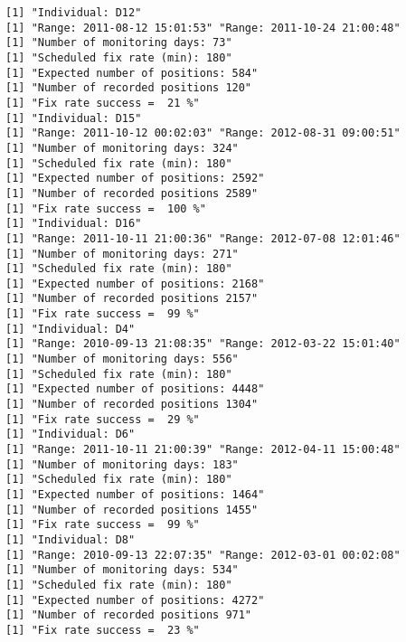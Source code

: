 \documentclass[
  letterpaper,
]{book}
\newenvironment{Shaded}{\begin{snugshade}}{\end{snugshade}}
\newcommand{\DecValTok}[1]{\textcolor[rgb]{0.68,0.00,0.00}{#1}}
\newcommand{\DocumentationTok}[1]{\textcolor[rgb]{0.37,0.37,0.37}{\textit{#1}}}
\newcommand{\FunctionTok}[1]{\textcolor[rgb]{0.28,0.35,0.67}{#1}}
\newcommand{\NormalTok}[1]{\textcolor[rgb]{0.00,0.23,0.31}{#1}}
\newcommand{\OtherTok}[1]{\textcolor[rgb]{0.00,0.23,0.31}{#1}}
\newcommand{\SpecialCharTok}[1]{\textcolor[rgb]{0.37,0.37,0.37}{#1}}
\begin{document}
\begin{verbatim}
[1] "Individual: D12"
[1] "Range: 2011-08-12 15:01:53" "Range: 2011-10-24 21:00:48"
[1] "Number of monitoring days: 73"
[1] "Scheduled fix rate (min): 180"
[1] "Expected number of positions: 584"
[1] "Number of recorded positions 120"
[1] "Fix rate success =  21 %"
[1] "Individual: D15"
[1] "Range: 2011-10-12 00:02:03" "Range: 2012-08-31 09:00:51"
[1] "Number of monitoring days: 324"
[1] "Scheduled fix rate (min): 180"
[1] "Expected number of positions: 2592"
[1] "Number of recorded positions 2589"
[1] "Fix rate success =  100 %"
[1] "Individual: D16"
[1] "Range: 2011-10-11 21:00:36" "Range: 2012-07-08 12:01:46"
[1] "Number of monitoring days: 271"
[1] "Scheduled fix rate (min): 180"
[1] "Expected number of positions: 2168"
[1] "Number of recorded positions 2157"
[1] "Fix rate success =  99 %"
[1] "Individual: D4"
[1] "Range: 2010-09-13 21:08:35" "Range: 2012-03-22 15:01:40"
[1] "Number of monitoring days: 556"
[1] "Scheduled fix rate (min): 180"
[1] "Expected number of positions: 4448"
[1] "Number of recorded positions 1304"
[1] "Fix rate success =  29 %"
[1] "Individual: D6"
[1] "Range: 2011-10-11 21:00:39" "Range: 2012-04-11 15:00:48"
[1] "Number of monitoring days: 183"
[1] "Scheduled fix rate (min): 180"
[1] "Expected number of positions: 1464"
[1] "Number of recorded positions 1455"
[1] "Fix rate success =  99 %"
[1] "Individual: D8"
[1] "Range: 2010-09-13 22:07:35" "Range: 2012-03-01 00:02:08"
[1] "Number of monitoring days: 534"
[1] "Scheduled fix rate (min): 180"
[1] "Expected number of positions: 4272"
[1] "Number of recorded positions 971"
[1] "Fix rate success =  23 %"
\end{verbatim}

\begin{Shaded}
\end{Shaded}
\end{document}
